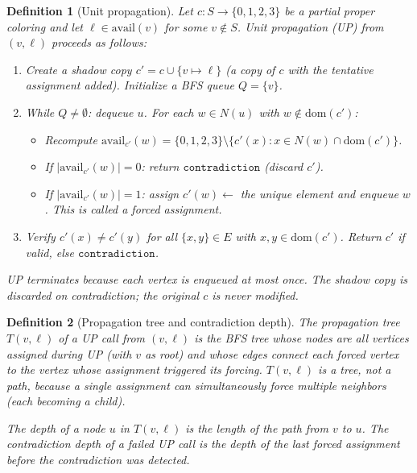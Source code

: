 \documentclass[11pt,twocolumn]{article}
\newtheorem{definition}{Definition}[section]
\begin{document}
\begin{definition}[Unit propagation]
\label{def:up}
Let $c:S\to\{0,1,2,3\}$ be a partial proper coloring and let
$\ell\in\mathrm{avail}(v)$ for some $v\notin S$.
\emph{Unit propagation} (UP) from $(v,\ell)$ proceeds as follows:
\begin{enumerate}[noitemsep]
  \item Create a \emph{shadow copy} $c'=c\cup\{v\mapsto\ell\}$ (a copy of
        $c$ with the tentative assignment added).  Initialize a BFS queue
        $Q=\{v\}$.
  \item While $Q\ne\emptyset$: dequeue $u$.  For each $w\in N(u)$ with
        $w\notin\mathrm{dom}(c')$:
        \begin{itemize}[noitemsep]
          \item Recompute $\mathrm{avail}_{c'}(w)=\{0,1,2,3\}\setminus
                \{c'(x):x\in N(w)\cap\mathrm{dom}(c')\}$.
          \item If $|\mathrm{avail}_{c'}(w)|=0$: return
                $\mathtt{contradiction}$ (discard $c'$).
          \item If $|\mathrm{avail}_{c'}(w)|=1$: assign $c'(w)\gets$ the
                unique element and enqueue $w$.
                This is called a \emph{forced assignment}.
        \end{itemize}
  \item Verify $c'(x)\ne c'(y)$ for all $\{x,y\}\in E$ with
        $x,y\in\mathrm{dom}(c')$.  Return $c'$ if valid, else
        $\mathtt{contradiction}$.
\end{enumerate}
UP terminates because each vertex is enqueued at most once.  The shadow
copy is discarded on contradiction; the original $c$ is never modified.
\end{definition}

\begin{definition}[Propagation tree and contradiction depth]
\label{def:tree}
The \emph{propagation tree} $T(v,\ell)$ of a UP call from $(v,\ell)$ is
the BFS tree whose nodes are all vertices assigned during UP (with $v$ as
root) and whose edges connect each forced vertex to the vertex whose
assignment triggered its forcing.  $T(v,\ell)$ is a \emph{tree}, not a
path, because a single assignment can simultaneously force multiple
neighbors (each becoming a child).

The \emph{depth} of a node $u$ in $T(v,\ell)$ is the length of the path
from $v$ to $u$.  The \emph{contradiction depth} of a failed UP call is
the depth of the last forced assignment before the contradiction was
detected.
\end{definition}
\end{document}
